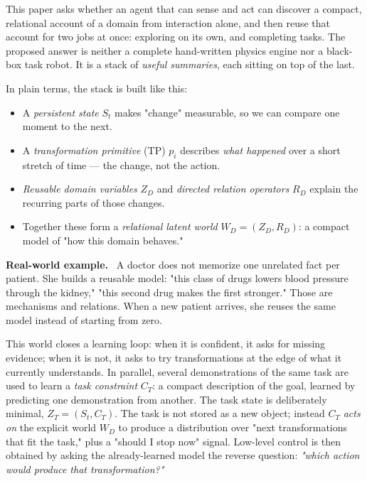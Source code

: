 \documentclass[11pt]{article}
\newenvironment{example}{%
  \par\smallskip\noindent\begin{minipage}{\textwidth}%
  \color{teal!60!black}\small
  \textbf{\color{teal!70!black}Real-world example.}\
}{%
  \end{minipage}\par\smallskip}
\begin{document}
This paper asks whether an agent that can sense and act can discover a compact, relational account of a domain from
interaction alone, and then reuse that account for two jobs at once: exploring on its own, and completing tasks.
The proposed answer is neither a complete hand-written physics engine nor a black-box task robot. It is a stack of
\emph{useful summaries}, each sitting on top of the last.

In plain terms, the stack is built like this:

\begin{itemize}
\item A \emph{persistent state} $S_t$ makes "change" measurable, so we can compare one moment to the next.
\item A \emph{transformation primitive} (TP) $p_i$ describes \emph{what happened} over a short stretch of time --- the change, not the action.
\item \emph{Reusable domain variables} $Z_D$ and \emph{directed relation operators} $R_D$ explain the recurring parts of those changes.
\item Together these form a \emph{relational latent world} $W_D=(Z_D,R_D)$: a compact model of "how this domain behaves."
\end{itemize}

\begin{example}
A doctor does not memorize one unrelated fact per patient. She builds a reusable model: "this class of drugs lowers blood
pressure through the kidney," "this second drug makes the first stronger." Those are mechanisms and relations. When a new
patient arrives, she reuses the same model instead of starting from zero.
\end{example}

This world closes a learning loop: when it is confident, it asks for missing evidence; when it is not, it asks to try
transformations at the edge of what it currently understands. In parallel, several demonstrations of the same task are used to
learn a \emph{task constraint} $C_T$: a compact description of the goal, learned by predicting one demonstration from another.
The task state is deliberately minimal, $Z_T=(S_t,C_T)$. The task is not stored as a new object; instead $C_T$ \emph{acts on} the
explicit world $W_D$ to produce a distribution over "next transformations that fit the task," plus a "should I stop now" signal.
Low-level control is then obtained by asking the already-learned model the reverse question: \emph{"which action would produce
that transformation?"}
\end{document}
